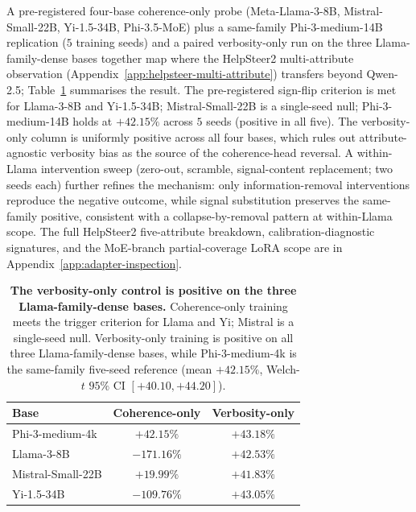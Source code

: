 \documentclass{article}
\begin{document}
A pre-registered four-base coherence-only probe (Meta-Llama-3-8B,
Mistral-Small-22B, Yi-1.5-34B, Phi-3.5-MoE) plus a same-family
Phi-3-medium-14B replication ($5$ training seeds) and a paired
verbosity-only run on the three Llama-family-dense bases together
map where the HelpSteer2 multi-attribute observation
(Appendix~\ref{app:helpsteer-multi-attribute}) transfers beyond
Qwen-2.5; Table~\ref{tab:base-transfer-grid} summarises the result.
The pre-registered sign-flip criterion is met for Llama-3-8B and Yi-1.5-34B;
Mistral-Small-22B is a single-seed null; Phi-3-medium-14B holds at
$+42.15\%$ across $5$ seeds (positive in all five).
The verbosity-only column is uniformly positive across all four
bases, which rules out attribute-agnostic verbosity bias as the
source of the coherence-head reversal. A within-Llama
intervention sweep (zero-out, scramble, signal-content
replacement; two seeds each) further refines the mechanism: only
information-removal interventions reproduce the negative outcome, while
signal substitution preserves the same-family positive,
consistent with a collapse-by-removal pattern at within-Llama
scope. The full HelpSteer2 five-attribute breakdown,
calibration-diagnostic signatures, and the MoE-branch
partial-coverage LoRA scope are in
Appendix~\ref{app:adapter-inspection}.

\begin{table}[htbp]
\caption{\textbf{The verbosity-only control is positive on the three
Llama-family-dense bases.} Coherence-only training meets the
trigger criterion for Llama and Yi; Mistral is a single-seed null.
Verbosity-only training is positive on all three Llama-family-dense
bases, while Phi-3-medium-4k is the same-family five-seed reference
(mean $+42.15\%$, Welch-$t$ $95\%$ CI $[+40.10, +44.20]$).}
\label{tab:base-transfer-grid}
\centering\scriptsize
\setlength{\tabcolsep}{2.5pt}
\begin{tabular}{lcc}
\toprule
Base & Coherence-only & Verbosity-only \\
\midrule
Phi-3-medium-4k & $+42.15\%$ & $+43.18\%$ \\
Llama-3-8B              & $-171.16\%$ & $+42.53\%$ \\
Mistral-Small-22B       & $+19.99\%$  & $+41.83\%$ \\
Yi-1.5-34B              & $-109.76\%$ & $+43.05\%$ \\
\bottomrule
\end{tabular}
\end{table}

\end{document}
